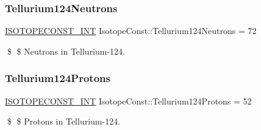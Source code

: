 \subsubsection{\texorpdfstring{Tellurium124\+Neutrons}{Tellurium124Neutrons}}
{\footnotesize\ttfamily \mbox{\hyperlink{group___isotope_const-_macros_ga5f18360b3e99483a35c32d789e62621c}{I\+S\+O\+T\+O\+P\+E\+C\+O\+N\+S\+T\+\_\+\+I\+NT}} Isotope\+Const\+::\+Tellurium124\+Neutrons = 72}

\$ \$ Neutrons in Tellurium-\/124. \mbox{\label{group___isotope_const-_tellurium-_te124_gab623c448bffeaf0e2c4ebed3e0405d97}} 
\subsubsection{\texorpdfstring{Tellurium124\+Protons}{Tellurium124Protons}}
{\footnotesize\ttfamily \mbox{\hyperlink{group___isotope_const-_macros_ga5f18360b3e99483a35c32d789e62621c}{I\+S\+O\+T\+O\+P\+E\+C\+O\+N\+S\+T\+\_\+\+I\+NT}} Isotope\+Const\+::\+Tellurium124\+Protons = 52}

\$ \$ Protons in Tellurium-\/124. 